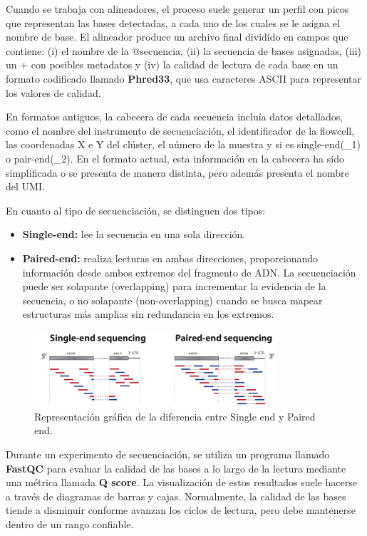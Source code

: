 Cuando se trabaja con alineadores, el proceso suele generar un perfil con picos que representan las bases detectadas, a cada uno de los cuales se le asigna el nombre de base. El alineador produce un archivo final dividido en campos que contiene: (i) el nombre de la $@$secuencia, (ii) la secuencia de bases asignadas, (iii) un + con posibles metadatos y (iv) la calidad de lectura de cada base en un formato codificado llamado \textbf{Phred33}, que usa caracteres ASCII para representar los valores de calidad.

En formatos antiguos, la cabecera de cada secuencia incluía datos detallados, como el nombre del instrumento de secuenciación, el identificador de la flowcell, las coordenadas X e Y del clúster, el número de la muestra y si es single-end(\_1) o pair-end(\_2). En el formato actual, esta información en la cabecera ha sido simplificada o se presenta de manera distinta, pero además presenta el nombre del UMI.

En cuanto al tipo de secuenciación, se distinguen dos tipos:
\begin{itemize}
\item \textbf{Single-end:} lee la secuencia en una sola dirección.
\item \textbf{Paired-end:} realiza lecturas en ambas direcciones, proporcionando información desde ambos extremos del fragmento de ADN. La secuenciación puede ser solapante (overlapping) para incrementar la evidencia de la secuencia, o no solapante (non-overlapping) cuando se busca mapear estructuras más amplias sin redundancia en los extremos.
\end{itemize}

\begin{figure}[htbp]
\centering
\includegraphics[width = 0.8\textwidth]{figs/singleEndVsPairedEnd.png}
\caption{Representación gráfica de la diferencia entre Single end y Paired end.}
\end{figure}

Durante un experimento de secuenciación, se utiliza un programa llamado \textbf{FastQC} para evaluar la calidad de las bases a lo largo de la lectura mediante una métrica llamada \textbf{Q score}. La visualización de estos resultados suele hacerse a través de diagramas de barras y cajas. Normalmente, la calidad de las bases tiende a disminuir conforme avanzan los ciclos de lectura, pero debe mantenerse dentro de un rango confiable.

